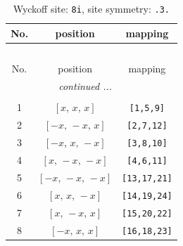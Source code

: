 \documentclass[fleqn,8pt]{jsarticle}
\begin{document}
\renewcommand{\arraystretch}{1.2}
\begin{longtable}{ccc}
\caption{Wyckoff site: {\tt 8i}, site symmetry: {\tt .3.}}
 \\
 \hline \hline
No. & position & mapping \\ \hline \endfirsthead

\multicolumn{2}{l}{\tablename\ \thetable{}} \\
 \hline \hline
No. & position & mapping \\ \hline \endhead

 \hline \hline
\multicolumn{2}{r}{\footnotesize\it continued ...} \\ \endfoot

 \hline \hline
\multicolumn{2}{r}{} \\ \endlastfoot

1 & $\left[ x,\, x,\, x \right]$ & {\tt [1,5,9]} \\ \hline
2 & $\left[ - x,\, - x,\, x \right]$ & {\tt [2,7,12]} \\ \hline
3 & $\left[ - x,\, x,\, - x \right]$ & {\tt [3,8,10]} \\ \hline
4 & $\left[ x,\, - x,\, - x \right]$ & {\tt [4,6,11]} \\ \hline
5 & $\left[ - x,\, - x,\, - x \right]$ & {\tt [13,17,21]} \\ \hline
6 & $\left[ x,\, x,\, - x \right]$ & {\tt [14,19,24]} \\ \hline
7 & $\left[ x,\, - x,\, x \right]$ & {\tt [15,20,22]} \\ \hline
8 & $\left[ - x,\, x,\, x \right]$ & {\tt [16,18,23]} \\
\end{longtable}
\renewcommand{\arraystretch}{1.2}
\end{document}
